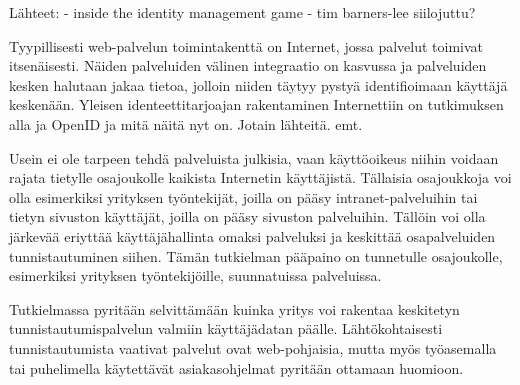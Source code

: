 Lähteet:
- inside the identity management game
- tim barners-lee siilojuttu?

Tyypillisesti web-palvelun toimintakenttä on Internet, jossa palvelut toimivat itsenäisesti. Näiden palveluiden välinen integraatio on kasvussa ja palveluiden kesken halutaan jakaa tietoa, jolloin niiden täytyy pystyä identifioimaan käyttäjä keskenään. Yleisen identeettitarjoajan rakentaminen Internettiin on tutkimuksen alla ja OpenID ja mitä näitä nyt on. Jotain lähteitä. emt.

Usein ei ole tarpeen tehdä palveluista julkisia, vaan käyttöoikeus niihin voidaan rajata tietylle osajoukolle kaikista Internetin käyttäjistä. Tällaisia osajoukkoja voi olla esimerkiksi yrityksen työntekijät, joilla on pääsy intranet-palveluihin tai tietyn sivuston käyttäjät, joilla on pääsy sivuston palveluihin. Tällöin voi olla järkevää eriyttää käyttäjähallinta omaksi palveluksi ja keskittää osapalveluiden tunnistautuminen siihen. Tämän tutkielman pääpaino on tunnetulle osajoukolle, esimerkiksi yrityksen työntekijöille, suunnatuissa palveluissa.

Tutkielmassa pyritään selvittämään kuinka yritys voi rakentaa keskitetyn tunnistautumispalvelun valmiin käyttäjädatan päälle. Lähtökohtaisesti tunnistautumista vaativat palvelut ovat web-pohjaisia, mutta myös työasemalla tai puhelimella käytettävät asiakasohjelmat pyritään ottamaan huomioon.